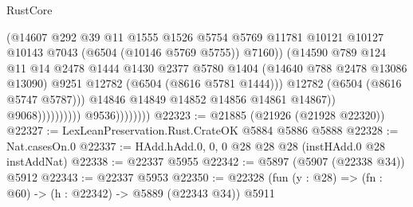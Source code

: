 \begin{lexlean}{RustCore}
\begin{coremodule}
                                                (@14607
                                                  @292
                                                  @39
                                                  @11
                                                  @1555
                                                  @1526
                                                  @5754
                                                  @5769
                                                  @11781
                                                  @10121
                                                  @10127
                                                  @10143
                                                  @7043
                                                  (@6504 (@10146 @5769 @5755))
                                                  @7160))
                                              (@14590
                                                @789
                                                @124
                                                @11
                                                @14
                                                @2478
                                                @1444
                                                @1430
                                                @2377
                                                @5780
                                                @1404
                                                (@14640 @788 @2478 @13086 @13090)
                                                @9251
                                                @12782
                                                (@6504 (@8616 @5781 @1444)))
                                              @12782
                                              (@6504 (@8616 @5747 @5787)))
                                            @14846
                                            @14849
                                            @14852
                                            @14856
                                            @14861
                                            @14867))
                                        @9068))))))))))
                    @9536))))))))
@22323 := @21885 (@21926 (@21928 @22320))
@22327 := LexLeanPreservation.Rust.CrateOK @5884 @5886 @5888
@22328 := Nat.casesOn.{0}
@22337 := HAdd.hAdd.{0, 0, 0} @28 @28 @28 (instHAdd.{0} @28 instAddNat)
@22338 := @22337 @5955
@22342 := @5897 (@5907 (@22338 @34)) @5912
@22343 := @22337 @5953
@22350 := @22328 (fun (y : @28) => (fn : @60) -> (h : @22342) -> @5889 (@22343 @34)) @5911

\end{coremodule}
\end{lexlean}

